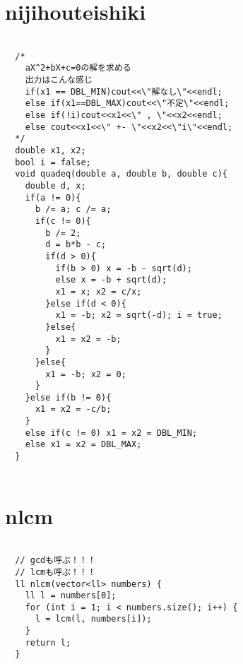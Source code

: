 \documentclass{jsarticle}
\begin{document}
\section{nijihouteishiki}
\color{black}
\begin{lstlisting}[caption=nijihouteishiki]

  /*
    aX^2+bX+c=0の解を求める
    出力はこんな感じ
    if(x1 == DBL_MIN)cout<<\"解なし\"<<endl;
    else if(x1==DBL_MAX)cout<<\"不定\"<<endl;
    else if(!i)cout<<x1<<\" , \"<<x2<<endl;
    else cout<<x1<<\" +- \"<<x2<<\"i\"<<endl;
  */
  double x1, x2;
  bool i = false;
  void quadeq(double a, double b, double c){
    double d, x;
    if(a != 0){
      b /= a; c /= a;
      if(c != 0){
        b /= 2;
        d = b*b - c;
        if(d > 0){
          if(b > 0) x = -b - sqrt(d);
          else x = -b + sqrt(d);
          x1 = x; x2 = c/x;
        }else if(d < 0){
          x1 = -b; x2 = sqrt(-d); i = true;
        }else{
          x1 = x2 = -b;
        }
      }else{
        x1 = -b; x2 = 0;
      }
    }else if(b != 0){
      x1 = x2 = -c/b;
    }
    else if(c != 0) x1 = x2 = DBL_MIN;
    else x1 = x2 = DBL_MAX;
  }
  

\end{lstlisting}

\color{white}
\section{nlcm}
\color{black}
\begin{lstlisting}[caption=nlcm]

  // gcdも呼ぶ！！！
  // lcmも呼ぶ！！！
  ll nlcm(vector<ll> numbers) {
    ll l = numbers[0];
    for (int i = 1; i < numbers.size(); i++) {
      l = lcm(l, numbers[i]);
    }
    return l;
  }
  

\end{lstlisting}

\color{white}
\end{document}
